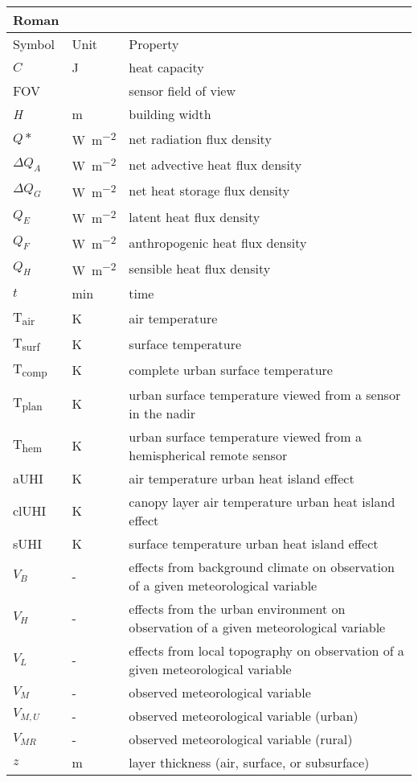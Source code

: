 \begin{table}[H]
	\centering
	\begin{tabular}{p{1.5cm}p{2cm}p{10cm}}
		Roman &&\\
		\toprule
		
		Symbol & Unit & Property \\
		\midrule
		$C$ & \si{\joule} & heat capacity \\
		FOV & \si{\deg} & sensor field of view \\
		\textit{H} & \si{\meter} & building width \\
		$Q*$ & \si{\watt\per\square\meter} & net radiation flux density \\
		$\Delta Q_A$ & \si{\watt\per\square\meter} & net advective heat flux density \\
		$\Delta Q_G$ & \si{\watt\per\square\meter} & net heat storage flux density \\
		$Q_E$ & \si{\watt\per\square\meter} & latent heat flux density \\
		$Q_F$ & \si{\watt\per\square\meter} & anthropogenic heat flux density \\
		$Q_H$ & \si{\watt\per\square\meter} & sensible heat flux density \\
		$t$ & \si{\minute} & time \\
		T\textsubscript{air} & \si{\kelvin} & air temperature \\
		T\textsubscript{surf} & \si{\kelvin} & surface temperature \\
		T\textsubscript{comp} & \si{\kelvin} & complete urban surface temperature\\
		T\textsubscript{plan} & \si{\kelvin} & urban surface temperature viewed from a sensor in the nadir\\
		T\textsubscript{hem} & \si{\kelvin} & urban surface temperature viewed from a hemispherical remote sensor\\
		aUHI & \si{\kelvin} & air temperature urban heat island effect \\
		clUHI & \si{\kelvin} & canopy layer air temperature urban heat island effect \\
		sUHI & \si{\kelvin} & surface temperature urban heat island effect \\
		$V_B$ & - & effects from background climate on observation of a given meteorological variable \\
		$V_H$ & - & effects from the urban environment on observation of a given meteorological variable \\
		$V_L$ & - & effects from local topography on observation of a given meteorological variable \\
		$V_M$ & - & observed meteorological variable \\
		$V_{M, U} $ & - & observed meteorological variable (urban) \\
		$V_{M  R}$ & - & observed meteorological variable (rural) \\
		$z$ & \si{\meter} & layer thickness (air, surface, or subsurface)\\
		\bottomrule
	\end{tabular} 
\end{table}

